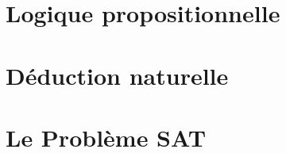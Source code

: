 \documentclass[a4paper, 12pt]{extarticle}
\begin{document}


\makemargins %
\makefrontpage
\maketoc


% 



\section{Logique propositionnelle}
\label{sec:logique_propositionnelle}

\newpage


\section{Déduction naturelle}
\label{sec:déduction_naturelle}

\newpage


\section{Le Problème SAT}
\label{sec:sat}

\newpage


\end{document}
